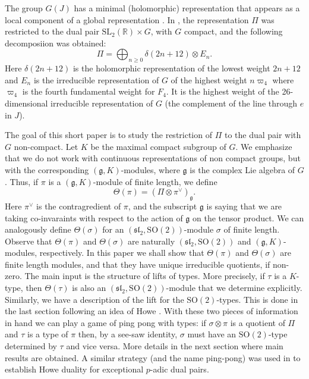 \documentclass[11pt]{amsart}
\theoremstyle{plain}
\numberwithin{equation}{section}
\newcommand{\SL}{{\mathrm{SL}}}
\newcommand{\SO}{{\mathrm{SO}}}
\begin{document}
\medskip 

The group $G(J)$ has a minimal (holomorphic) representation that appears as a local component of a global representation \cite{Kim}. In \cite{GS}, the 
representation $\Pi$ was restricted to the dual pair $\SL_2(\mathbb R) \times G$, with $G$ compact, and the following decomposiion was obtained: 
\[ 
\Pi= \bigoplus_{n\geq 0} \delta(2n+12) \otimes E_n. 
\] 
Here $\delta(2n+12)$ is the holomorphic representation of the lowest weight $2n+12$ and $E_n$ is the irreducible representation of $G$ of the highest weight 
$n\varpi_4$ where $\varpi_4$ is the fourth fundamental weight for $F_4$. It is the highest weight of the 26-dimensional irreducible representation of $G$ (the complement 
of the line through $e$ in $J$).  

The goal of this short paper is to study the restriction of $\Pi$ to the dual pair with $G$ non-compact. Let $K$ be the maximal compact subgroup of $G$.  
We emphasize that we do not work with continuous representations of 
non compact groups, but with the corresponding $(\mathfrak g, K)$-modules, where $\mathfrak g$ is the complex Lie algebra of $G$. 
 Thus, if $\pi$ is a $(\mathfrak g, K)$-module of finite length, we define 
\[ 
\Theta(\pi)= (\Pi \otimes \pi^{\vee})_{\mathfrak g}. 
\] 
Here $\pi^{\vee}$ is the contragredient of $\pi$, and the subscript $\mathfrak g$ is saying that we are taking co-invaraints with respect to the action of $\mathfrak g$ on 
the tensor product. We can analogously define $\Theta(\sigma)$ for an $(\mathfrak{sl}_2,\SO(2))$-module $\sigma$ of finite length.  Observe that 
$\Theta(\pi)$ and $\Theta(\sigma)$ are  naturally $(\mathfrak{sl}_2,\SO(2))$ and $(\mathfrak g, K)$-modules, respectively.  In this paper we shall show that 
$\Theta(\pi)$ and $\Theta(\sigma)$ are finite length modules, and that they have unique irreducible quotients, if non-zero.  
 The main input is the structure of lifts of types. More precisely, if $\tau$ is a $K$-type, then $\Theta(\tau)$ is also 
 an $(\mathfrak{sl}_2,\SO(2))$-module that we determine explicitly. Similarly, we have a description of the lift for the $\SO(2)$-types.  
This is done in the last section following an idea of Howe \cite{Ho}. 
With these two pieces of information in hand we can play a game of ping pong with types: if $\sigma \otimes \pi$ is a quotient of $\Pi$ and $\tau$ is a type of $\pi$ then, by a 
see-saw identity,  $\sigma$ must have 
an $\SO(2)$-type determined by $\tau$ and vice versa. More details in the next section where main results are obtained.  
A similar strategy (and the name ping-pong) was used  in \cite{GS} to establish Howe duality for exceptional $p$-adic dual pairs. 
\end{document}
